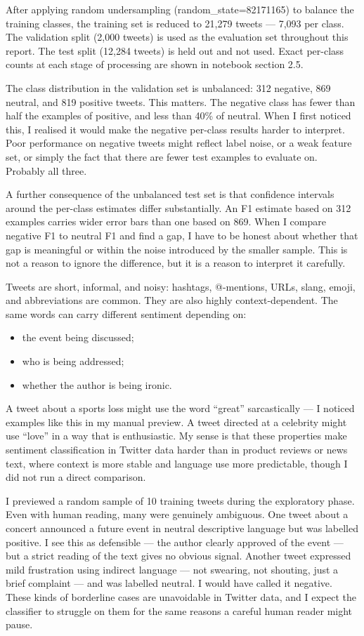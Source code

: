 \documentclass[12pt]{article}
\begin{document}
After applying random undersampling (random\_state=82171165) to balance the training classes, the training set is reduced to 21,279 tweets --- 7,093 per class. The validation split (2,000 tweets) is used as the evaluation set throughout this report. The test split (12,284 tweets) is held out and not used. Exact per-class counts at each stage of processing are shown in notebook section 2.5.

The class distribution in the validation set is unbalanced: 312 negative, 869 neutral, and 819 positive tweets. This matters. The negative class has fewer than half the examples of positive, and less than 40\% of neutral. When I first noticed this, I realised it would make the negative per-class results harder to interpret. Poor performance on negative tweets might reflect label noise, or a weak feature set, or simply the fact that there are fewer test examples to evaluate on. Probably all three.

A further consequence of the unbalanced test set is that confidence intervals around the per-class estimates differ substantially. An F1 estimate based on 312 examples carries wider error bars than one based on 869. When I compare negative F1 to neutral F1 and find a gap, I have to be honest about whether that gap is meaningful or within the noise introduced by the smaller sample. This is not a reason to ignore the difference, but it is a reason to interpret it carefully.

Tweets are short, informal, and noisy: hashtags, @-mentions, URLs, slang, emoji, and abbreviations are common. They are also highly context-dependent. The same words can carry different sentiment depending on:
\begin{itemize}
  \item the event being discussed;
  \item who is being addressed;
  \item whether the author is being ironic.
\end{itemize} A tweet about a sports loss might use the word ``great'' sarcastically --- I noticed examples like this in my manual preview. A tweet directed at a celebrity might use ``love'' in a way that is enthusiastic. My sense is that these properties make sentiment classification in Twitter data harder than in product reviews or news text, where context is more stable and language use more predictable, though I did not run a direct comparison.

I previewed a random sample of 10 training tweets during the exploratory phase. Even with human reading, many were genuinely ambiguous. One tweet about a concert announced a future event in neutral descriptive language but was labelled positive. I see this as defensible --- the author clearly approved of the event --- but a strict reading of the text gives no obvious signal. Another tweet expressed mild frustration using indirect language --- not swearing, not shouting, just a brief complaint --- and was labelled neutral. I would have called it negative. These kinds of borderline cases are unavoidable in Twitter data, and I expect the classifier to struggle on them for the same reasons a careful human reader might pause.
\end{document}
